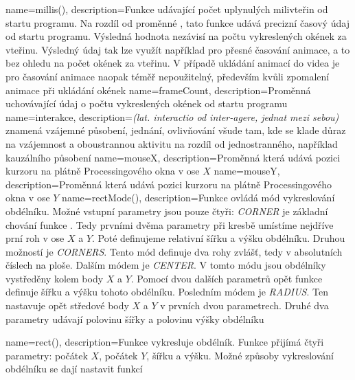 
{
  name={millis()},
  description={Funkce udávající počet uplynulých milivteřin od startu programu. Na rozdíl od proměnné , tato funkce udává precizní časový údaj od startu programu. Výsledná hodnota nezávisí na počtu vykreslených okének za vteřinu. Výsledný údaj tak lze využít například pro přesné časování animace, a to bez ohledu na počet okének za vteřinu. V případě ukládání animací do videa je pro časování animace naopak téměř nepoužitelný, především kvůli zpomalení animace při ukládání okének}
}
{ 
  name={frameCount},
  description={Proměnná uchovávající údaj o počtu vykreslených okének od startu programu}
}
{
  name={interakce},
  description={{\em (lat. interactio od inter-agere, jednat mezi sebou)} znamená vzájemné působení, jednání, ovlivňování všude tam, kde se klade důraz na vzájemnost a oboustrannou aktivitu na rozdíl od jednostranného, například kauzálního působení}
}
{
  name={mouseX},
  description={Proměnná která udává pozici kurzoru na plátně Processingového okna v ose $X$}
}
{
  name={mouseY},
  description={Proměnná která udává pozici kurzoru na plátně Processingového okna v ose $Y$}
}
{
  name={rectMode()},
  description={Funkce ovládá mód vykreslování obdélníku. Možné vstupní parametry jsou pouze čtyři:  {\em CORNER} je základní chování funkce . Tedy prvními dvěma parametry při kresbě umístíme nejdříve prní roh v ose $X$ a $Y$. Poté definujeme relativní šířku a výšku obdélníku. Druhou možností je {\em CORNERS}. Tento mód definuje dva rohy zvlášť, tedy v absolutních číslech na ploše. Dalším módem je {\em CENTER}. V tomto módu jsou obdélníky vystředěny kolem body $X$ a $Y$. Pomocí dvou dalších parametrů opět funkce  definuje šířku a výšku tohoto obdélníku. Posledním módem je {\em RADIUS}. Ten nastavuje opět středové body $X$ a $Y$ v prvních dvou parametrech. Druhé dva parametry udávají polovinu šířky a polovinu výšky obdélníku}
}

{
  name={rect()},
  description={Funkce vykresluje obdélník. Funkce přijímá čtyři parametry: počátek $X$, počátek $Y$, šířku a výšku. Možné způsoby vykreslování obdélníku se dají nastavit funkcí }
}

